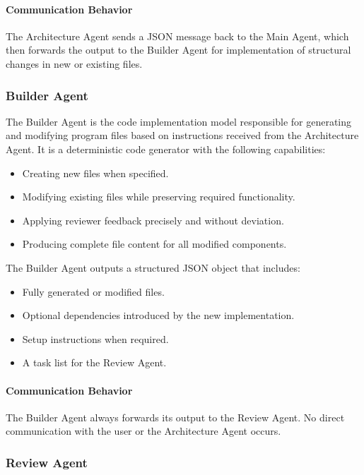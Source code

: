 \documentclass[12pt,a4paper]{article}
\begin{document}
\paragraph{Communication Behavior}
The Architecture Agent sends a JSON message back to the Main Agent, which then forwards the output to the Builder Agent for implementation of structural changes in new or existing files.

\subsubsection{Builder Agent}

The Builder Agent is the code implementation model responsible for generating and modifying program files based on instructions received from the Architecture Agent. It is a deterministic code generator with the following capabilities:

\begin{itemize}
    \item Creating new files when specified.
    \item Modifying existing files while preserving required functionality.
    \item Applying reviewer feedback precisely and without deviation.
    \item Producing complete file content for all modified components.
\end{itemize}

The Builder Agent outputs a structured JSON object that includes:

\begin{itemize}
    \item Fully generated or modified files.
    \item Optional dependencies introduced by the new implementation.
    \item Setup instructions when required.
    \item A task list for the Review Agent.
\end{itemize}

\paragraph{Communication Behavior}
The Builder Agent always forwards its output to the Review Agent. No direct communication with the user or the Architecture Agent occurs.

\subsubsection{Review Agent}
\end{document}
